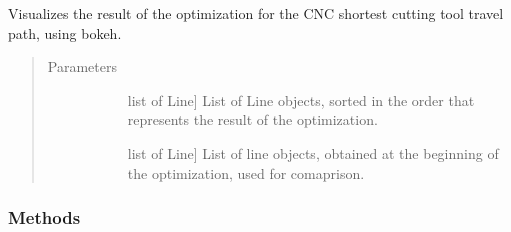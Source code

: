 \documentclass[letterpaper,10pt,english,openany,oneside]{sphinxmanual}
\begin{document}
\begin{fulllineitems}
\label{\detokenize{reference:cnc.visualization.Visualizer}}
Visualizes the result of the optimization for the CNC shortest cutting tool
travel path, using bokeh.
\begin{quote}\begin{description}
\item[{Parameters}] \leavevmode\begin{description}
\item[{}] \leavevmode{[}list of Line{]}
List of Line objects, sorted in the order that represents the
result of the optimization.

\item[{}] \leavevmode{[}list of Line{]}
List of line objects, obtained at the beginning of the
optimization, used for comaprison.

\end{description}

\end{description}\end{quote}
\subsubsection*{Methods}


\begin{savenotes}\sphinxatlongtablestart\begin{longtable}{}
\hline

\endfirsthead

%
{}\\
\hline

\endhead

\hline
{}\\
\endfoot

\endlastfoot


\end{longtable}
\end{savenotes}
\end{fulllineitems}
\end{document}
